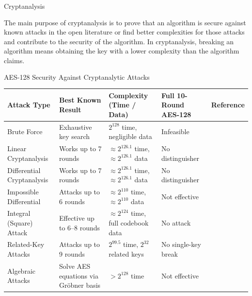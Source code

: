 \documentclass{beamer}
\begin{document}
\begin{frame}{Cryptanalysis}

    The main
purpose of cryptanalysis is to prove that an algorithm is secure against known attacks
in the open literature or find better complexities for those attacks and contribute to the
security of the algorithm. In cryptanalysis, breaking an algorithm means obtaining the
key with a lower complexity than the algorithm claims.
    
\end{frame}

\begin{frame}[t]{AES-128 Security Against Cryptanalytic Attacks}
\footnotesize %
\setlength{\tabcolsep}{4pt} %
\begin{tabularx}{\textwidth}{|l|X|X|X|l|}
\hline
\textbf{Attack Type} & \textbf{Best Known Result} & \textbf{Complexity (Time / Data)} & \textbf{Full 10-Round AES-128} & \textbf{Reference} \\
\hline
Brute Force & Exhaustive key search & $2^{128}$ time, negligible data & Infeasible & \cite{daemen2002rijndael} \\
\hline
Linear Cryptanalysis & Works up to 7 rounds & $\approx 2^{126.1}$ time, $\approx 2^{126.1}$ data & No distinguisher & \cite{matsui1993linear,daemen2002rijndael} \\
\hline
Differential Cryptanalysis & Works up to 7 rounds & $\approx 2^{126.1}$ time, $\approx 2^{126.1}$ data & No distinguisher & \cite{biham1991differential,daemen2002rijndael} \\
\hline
Impossible Differential & Attacks up to 6 rounds & $\approx 2^{110}$ time, $\approx 2^{110}$ data & Not effective & \cite{biryukov2009related} \\
\hline
Integral (Square) Attack & Effective up to 6--8 rounds & $\approx 2^{124}$ time, full codebook data & No attack & \cite{daemen1997square,ferguson2000algebraic} \\
\hline
Related-Key Attacks & Attacks up to 9 rounds & $2^{99.5}$ time, $2^{32}$ related keys & No single-key break & \cite{biryukov2009related} \\
\hline
Algebraic Attacks & Solve AES equations via Gröbner basis & $>2^{128}$ time & Not effective & \cite{courtois2002cryptanalysis} \\
\hline
\end{tabularx}
\end{frame}
\end{document}
